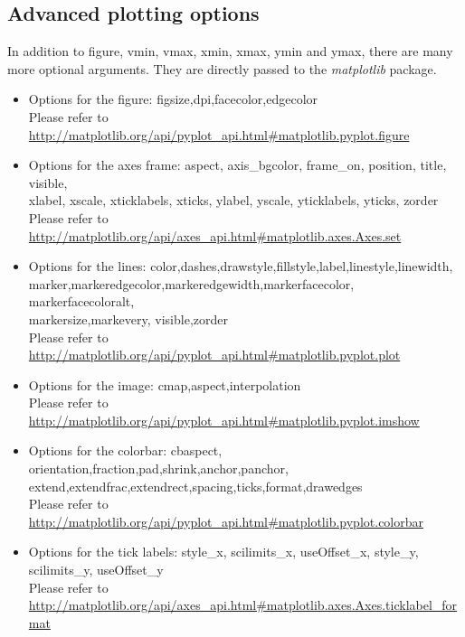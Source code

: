 \documentclass[11pt]{article}
\newcommand{\code}[1]{\colorbox{yellow!15}{\ttfamily #1}}
\begin{document}
\subsection{Advanced plotting options}
In addition to \code{figure}, \code{vmin}, \code{vmax}, \code{xmin}, \code{xmax}, \code{ymin} and \code{ymax}, there are many more optional arguments. They are directly passed to the \textit{matplotlib} package.
\begin{itemize}
\item Options for the figure: \code{figsize},\code{dpi},\code{facecolor},\code{edgecolor}\\
	Please refer to \url{http://matplotlib.org/api/pyplot_api.html#matplotlib.pyplot.figure}
\item Options for the axes frame: \code{aspect}, \code{axis\_bgcolor}, \code{frame\_on}, \code{position}, \code{title}, \code{visible},\\
	\code{xlabel}, \code{xscale}, \code{xticklabels}, \code{xticks}, \code{ylabel}, \code{yscale}, \code{yticklabels}, \code{yticks}, \code{zorder}\\
	Please refer to \url{http://matplotlib.org/api/axes_api.html#matplotlib.axes.Axes.set}
\item Options for the lines: \code{color},\code{dashes},\code{drawstyle},\code{fillstyle},\code{label},\code{linestyle},\code{linewidth},\\
	\code{marker},\code{markeredgecolor},\code{markeredgewidth},\code{markerfacecolor},	\code{markerfacecoloralt},\\
	\code{markersize},\code{markevery},	\code{visible},\code{zorder}\\
	Please refer to \url{http://matplotlib.org/api/pyplot_api.html#matplotlib.pyplot.plot}
\item Options for the image: \code{cmap},\code{aspect},\code{interpolation}\\
	Please refer to \url{http://matplotlib.org/api/pyplot_api.html#matplotlib.pyplot.imshow}
\item Options for the colorbar: \code{cbaspect}, \code{orientation},\code{fraction},\code{pad},\code{shrink},\code{anchor},\code{panchor},\\
	\code{extend},\code{extendfrac},\code{extendrect},\code{spacing},\code{ticks},\code{format},\code{drawedges}\\
	Please refer to \url{http://matplotlib.org/api/pyplot_api.html#matplotlib.pyplot.colorbar}
\item Options for the tick labels: \code{style\_x}, \code{scilimits\_x}, \code{useOffset\_x}, \code{style\_y}, \code{scilimits\_y}, \code{useOffset\_y}\\
	Please refer to \url{http://matplotlib.org/api/axes_api.html#matplotlib.axes.Axes.ticklabel_format}
\end{itemize}
\end{document}
